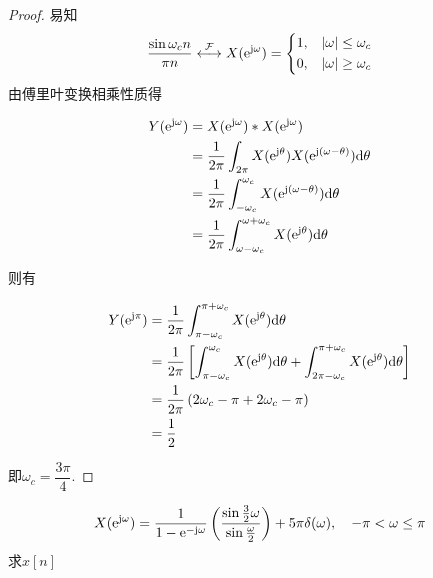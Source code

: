 \begin{proof}

    易知
    $$\dfrac{\sin{\omega_c n}}{{\pi n}} \stackrel{\mathcal{F}}{\longleftrightarrow} X(\mathrm{e}^{\mathrm{j} \omega}) = \left\{
        \begin{aligned}
            & 1, & |\omega| \leq \omega_c \\
            & 0, & |\omega| \geq \omega_c 
        \end{aligned}
        \right.
    $$
    由傅里叶变换相乘性质得
    
    \begin{align*}
        Y(\mathrm{e}^{\mathrm{j} \omega}) & = X(\mathrm{e}^{\mathrm{j} \omega}) \ast X(\mathrm{e}^{\mathrm{j} \omega}) \\
        & = \dfrac{1}{2\pi} \int_{2\pi}{X(\mathrm{e}^{\mathrm{j} \theta}) X(\mathrm{e}^{\mathrm{j} (\omega - \theta)})}\mathrm{d} \theta \\
        & = \dfrac{1}{2\pi} \int_{-\omega_c}^{\omega_c}{X(\mathrm{e}^{\mathrm{j} (\omega - \theta)})}\mathrm{d} \theta \\
        & = \dfrac{1}{2\pi} \int_{\omega -\omega_c}^{\omega + \omega_c}{X(\mathrm{e}^{\mathrm{j} \theta})}\mathrm{d} \theta
    \end{align*}

    则有
    
    \begin{align*}
        Y(\mathrm{e}^{\mathrm{j} \pi}) & = \dfrac{1}{2\pi} \int_{\pi -\omega_c}^{\pi + \omega_c}{X(\mathrm{e}^{\mathrm{j} \theta})}\mathrm{d} \theta \\
        & = \dfrac{1}{2\pi} \left[ \int_{\pi -\omega_c}^{\omega_c}{X(\mathrm{e}^{\mathrm{j} \theta})}\mathrm{d} \theta + \int_{2\pi - \omega_c}^{\pi + \omega_c}{X(\mathrm{e}^{\mathrm{j} \theta})}\mathrm{d} \theta \right] \\
        & = \dfrac{1}{2\pi} \left( 2\omega_c - \pi + 2\omega_c - \pi \right) \\
        & = \dfrac{1}{2} 
    \end{align*}

    即$\omega_c = \dfrac{3\pi}{4}$.

\end{proof}

\begin{proposition}

    $$X(\mathrm{e}^{\mathrm{j} \omega}) = \dfrac{1}{1 - \mathrm{e}^{-\mathrm{j} \omega}} \left( \dfrac{\sin{\frac{3}{2}\omega}}{\sin{\frac{\omega}{2}}} \right) + 5\pi \delta(\omega), \quad -\pi < \omega \leq \pi$$
    求$x[n]$

\end{proposition}

